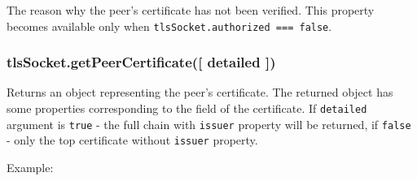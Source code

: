 The reason why the peer's certificate has not been verified. This
property becomes available only when
\texttt{tlsSocket.authorized === false}.

\subsubsection{tlsSocket.getPeerCertificate({[} detailed
{]})}\label{tlssocket.getpeercertificate-detailed}

Returns an object representing the peer's certificate. The returned
object has some properties corresponding to the field of the
certificate. If \texttt{detailed} argument is \texttt{true} - the full
chain with \texttt{issuer} property will be returned, if \texttt{false}
- only the top certificate without \texttt{issuer} property.

Example:

\begin{Shaded}
\begin{Highlighting}[]
\NormalTok{\{ }\NormalTok{:}
   \NormalTok{\{ }\NormalTok{: }\NormalTok{,}
     \NormalTok{: }\NormalTok{,}
     \NormalTok{: }\NormalTok{,}
     \NormalTok{: }\NormalTok{,}
     \NormalTok{: }\NormalTok{,}
     \NormalTok{: } \NormalTok{\},}
  \NormalTok{:}
   \NormalTok{\{ }\NormalTok{: }\NormalTok{,}
     \NormalTok{: }\NormalTok{,}
     \NormalTok{: }\NormalTok{,}
     \NormalTok{: }\NormalTok{,}
     \NormalTok{: }\NormalTok{,}
     \NormalTok{: } \NormalTok{\},}
  \NormalTok{:}
     
  \NormalTok{: }\NormalTok{,}
  \NormalTok{: }\NormalTok{,}
  \NormalTok{: }\NormalTok{,}
  \NormalTok{: } \NormalTok{\}}
\end{Highlighting}
\end{Shaded}

